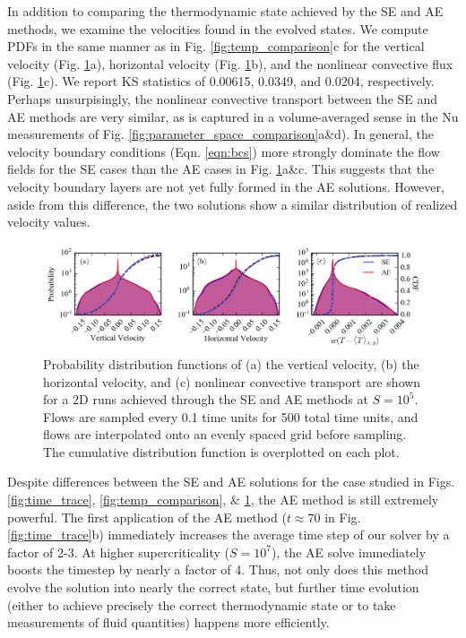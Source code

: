 \documentclass[aps, pre, onecolumn, nofootinbib, notitlepage, groupedaddress, amsfonts, amssymb, amsmath, longbibliography]{revtex4-1}
\begin{document}
In addition to comparing the thermodynamic state achieved by the SE and AE methods,
we examine the velocities found in the evolved states.
We compute PDFs in the same manner as in Fig. \ref{fig:temp_comparison}c for the
vertical velocity (Fig. \ref{fig:pdf_comparison}a), horizontal velocity (Fig. \ref{fig:pdf_comparison}b),
and the nonlinear convective flux (Fig. \ref{fig:pdf_comparison}c). We report KS statistics
of 0.00615, 0.0349, and 0.0204, respectively.  Perhaps unsurpisingly, the nonlinear
convective transport between the SE and AE methods are very similar, as is captured
in a volume-averaged sense in the Nu measurements of Fig. \ref{fig:parameter_space_comparison}a\&d).
In general, the velocity boundary conditions (Eqn. \ref{eqn:bcs}) more strongly dominate the flow
fields for the SE cases than the AE cases in Fig. \ref{fig:pdf_comparison}a\&c. 
This suggests that the velocity boundary layers are not yet fully formed in the
AE solutions. However, aside from this difference, the two solutions show a similar
distribution of realized velocity values.

\begin{figure}[b]
\includegraphics[width=\textwidth]{./figs/pdf_comparison.png}
\caption{Probability distribution functions of (a) the vertical velocity, (b) the horizontal velocity, and (c) nonlinear
convective transport are shown for a 2D runs achieved through the SE and AE methods
at $S = 10^{5}$.  Flows are sampled every 0.1 time units for 500 total time units,
and flows are interpolated onto an evenly spaced grid before sampling.
The cumulative distribution function is overplotted on each plot. 
\label{fig:pdf_comparison} }
\end{figure}


Despite differences between the SE and AE solutions for the case studied in 
Figs. \ref{fig:time_trace}, \ref{fig:temp_comparison}, \& \ref{fig:pdf_comparison},
the AE method is still extremely powerful.  The first application of the AE method
($t \approx 70$ in Fig. \ref{fig:time_trace}b) immediately increases the 
average time step of our solver by a factor of 2-3. At higher supercriticality
($S = 10^7$), the AE solve immediately boosts the timestep by nearly a factor of 4.
Thus, not only does this method evolve the solution into nearly the correct state, 
but further time evolution (either to achieve precisely the correct thermodynamic
state or to take measurements of fluid quantities) happens more efficiently.
\end{document}
